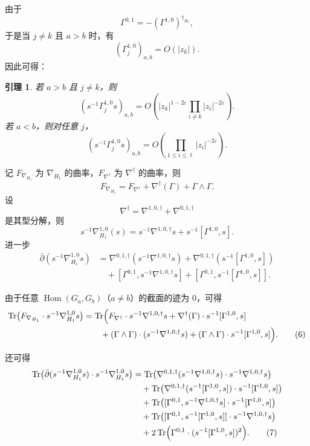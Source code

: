 \documentclass[12pt,a4paper]{article}
\newtheorem{lemma}[theorem]{引理}
\newcommand{\Tr}{\operatorname{Tr}}
\newcommand{\Hom}{\operatorname{Hom}}
\begin{document}
由于
\[
\Gamma^{0,1}=-(\Gamma^{1,0})^{\dagger_{H_1}},
\]
于是当 \(j\ne k\) 且 \(a>b\) 时，有
\[
(\Gamma_j^{1,0})_{a,b}=O(|z_k|).
\]
因此可得：

\begin{lemma}
若 \(a>b\) 且 \(j\ne k\)，则
\[
(s^{-1}\Gamma_j^{1,0}s)_{a,b}
=
O\left(
|z_k|^{1-2\varepsilon}\prod_{i\ne k}|z_i|^{-2\varepsilon}
\right).
\]
若 \(a<b\)，则对任意 \(j\)，
\[
(s^{-1}\Gamma_j^{1,0}s)_{a,b}
=
O\left(
\prod_{1\le i\le \ell}|z_i|^{-2\varepsilon}
\right).
\]
\end{lemma}

记 \(F_{\nabla_{H_1}}\) 为 \(\nabla_{H_1}\) 的曲率，\(F_{\nabla^\dagger}\) 为 \(\nabla^\dagger\) 的曲率，则
\[
F_{\nabla_{H_1}}=F_{\nabla^\dagger}+\nabla^\dagger(\Gamma)+\Gamma\wedge \Gamma.
\]
设
\[
\nabla^\dagger=\nabla^{1,0,\dagger}+\nabla^{0,1,\dagger}
\]
是其型分解，则
\[
s^{-1}\nabla^{1,0}_{H_1}(s)=s^{-1}\nabla^{1,0,\dagger}s+s^{-1}[\Gamma^{1,0},s].
\]
进一步
\begin{align}
\bar\partial(s^{-1}\nabla^{1,0}_{H_1}s)
&=
\nabla^{0,1,\dagger}(s^{-1}\nabla^{1,0,\dagger}s)
+\nabla^{0,1,\dagger}(s^{-1}[\Gamma^{1,0},s]) \nonumber\\
&\quad
+[\Gamma^{0,1},s^{-1}\nabla^{1,0,\dagger}s]
+[\Gamma^{0,1},s^{-1}[\Gamma^{1,0},s]]. \tag{5}
\end{align}

由于任意 \(\Hom(G_a,G_b)\)（\(a\ne b\)）的截面的迹为 0，可得
\begin{align}
\Tr\bigl(F_{\nabla_{H_1}}\cdot s^{-1}\nabla^{1,0}_{H_1}s\bigr)
&=
\Tr\Bigl(
F_{\nabla^\dagger}\cdot s^{-1}\nabla^{1,0,\dagger}s
+\nabla^\dagger(\Gamma)\cdot s^{-1}[\Gamma^{1,0},s]\nonumber\\
&\qquad
+(\Gamma\wedge\Gamma)\cdot(s^{-1}\nabla^{1,0,\dagger}s)
+(\Gamma\wedge\Gamma)\cdot s^{-1}[\Gamma^{1,0},s]
\Bigr). \tag{6}
\end{align}

还可得
\begin{align}
\Tr\bigl(\bar\partial(s^{-1}\nabla^{1,0}_{H_1}s)\cdot s^{-1}\nabla^{1,0}_{H_1}s\bigr)
&=
\Tr\bigl(\nabla^{0,1,\dagger}(s^{-1}\nabla^{1,0,\dagger}s)\cdot s^{-1}\nabla^{1,0,\dagger}s\bigr)\nonumber\\
&\quad
+\Tr\bigl(\nabla^{0,1,\dagger}(s^{-1}[\Gamma^{1,0},s])\cdot s^{-1}[\Gamma^{1,0},s]\bigr)\nonumber\\
&\quad
+\Tr\bigl([\Gamma^{0,1},s^{-1}\nabla^{1,0,\dagger}s]\cdot s^{-1}[\Gamma^{1,0},s]\bigr)\nonumber\\
&\quad
+\Tr\bigl([\Gamma^{0,1},s^{-1}[\Gamma^{1,0},s]]\cdot s^{-1}\nabla^{1,0,\dagger}s\bigr)\nonumber\\
&\quad
+2\Tr\Bigl(\Gamma^{0,1}\cdot (s^{-1}[\Gamma^{1,0},s])^2\Bigr). \tag{7}
\end{align}
\end{document}

